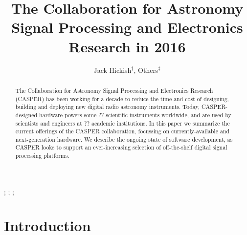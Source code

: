 \documentclass{ws-jai}
\begin{document}
\catchline{}{}{}{}{} %


\title{The Collaboration for Astronomy Signal Processing and Electronics Research in 2016}

\author{Jack Hickish$^\dagger$, Others$^\ddagger$}

\address{
$^\dagger$Radio Astronomy Laboratory, UC Berkeley, Berkeley, CA 94720, USA, jackh@astro.berkeley.edu\\
$^\ddagger$Group, Company, Address, City, State ZIP/Zone, Country\\
$^\S$Group, Company, Address, City, State ZIP/Zone, Country, fauthor@company.com
}

\maketitle


\begin{history}
;
;
;
\end{history}

\begin{abstract}

The Collaboration for Astronomy Signal Processing and Electronics Research
(CASPER) has been working for a decade to reduce the time and cost of designing,
building and deploying new digital radio astronomy instruments.  Today,
CASPER-designed hardware powers some ?? scientific instruments worldwide, and
are used by scientists and engineers at ?? academic institutions.  In this paper
we summarize the current offerings of the CASPER collaboration, focussing on
currently-available and next-generation hardware.  We describe the ongoing state
of software development, as CASPER looks to support an ever-increasing selection
of off-the-shelf digital signal processing platforms.

\end{abstract}



\section{Introduction}
\end{document}
